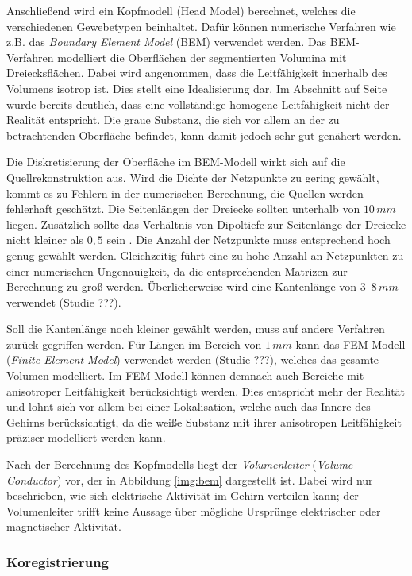 \documentclass[doc,a4paper,12pt]{apa6}
\makeatletter
\DeclareRobustCommand*{\nameref}[1]{%
      \glqq{\myorg@nameref{#1}}\grqq%
    }%
\makeatother
\begin{document}
Anschließend wird ein Kopfmodell (Head Model) berechnet, welches die verschiedenen Gewebetypen beinhaltet. Dafür können numerische Verfahren wie z.B. das \emph{Boundary Element Model} (BEM) verwendet werden. Das BEM-Verfahren modelliert die Oberflächen der segmentierten Volumina mit Dreiecksflächen. Dabei wird angenommen, dass die Leitfähigkeit innerhalb des Volumens isotrop ist. Dies stellt eine Idealisierung dar. Im Abschnitt \nameref{sec:head-struct} auf Seite \pageref{sec:head-struct} wurde bereits deutlich, dass eine vollständige homogene Leitfähigkeit nicht der Realität entspricht. Die graue Substanz, die sich vor allem an der zu betrachtenden Oberfläche befindet, kann damit jedoch sehr gut genähert werden.

Die Diskretisierung der Oberfläche im BEM-Modell wirkt sich auf die Quellrekonstruktion aus. Wird die Dichte der Netzpunkte zu gering gewählt, kommt es zu Fehlern in der numerischen Berechnung, die Quellen werden fehlerhaft geschätzt. Die Seitenlängen der Dreiecke sollten unterhalb von $10\,mm$ liegen. Zusätzlich sollte das Verhältnis von Dipoltiefe zur Seitenlänge der Dreiecke nicht kleiner als $0,5$ sein \parencite{haueisen1997effect}. Die Anzahl der Netzpunkte muss entsprechend hoch genug gewählt werden. Gleichzeitig führt eine zu hohe Anzahl an Netzpunkten zu einer numerischen Ungenauigkeit, da die entsprechenden Matrizen zur Berechnung zu groß werden. Überlicherweise wird eine Kantenlänge von $3$--$8\,mm$ verwendet (Studie ???).

Soll die Kantenlänge noch kleiner gewählt werden, muss auf andere Verfahren zurück gegriffen werden. Für Längen im Bereich von $1\,mm$ kann das FEM-Modell (\emph{Finite Element Model}) verwendet werden (Studie ???), welches das gesamte Volumen modelliert. Im FEM-Modell können demnach auch Bereiche mit anisotroper Leitfähigkeit berücksichtigt werden. Dies entspricht mehr der Realität und lohnt sich vor allem bei einer Lokalisation, welche auch das Innere des Gehirns berücksichtigt, da die weiße Substanz mit ihrer anisotropen Leitfähigkeit präziser modelliert werden kann.

Nach der Berechnung des Kopfmodells liegt der \emph{Volumenleiter} (\emph{Volume Conductor}) vor, der in Abbildung \ref{img:bem} dargestellt ist. Dabei wird nur beschrieben, wie sich elektrische Aktivität im Gehirn verteilen kann; der Volumenleiter trifft keine Aussage über mögliche Ursprünge elektrischer oder magnetischer Aktivität.

\subsubsection{Koregistrierung}
\label{sec:coreg}
\end{document}
